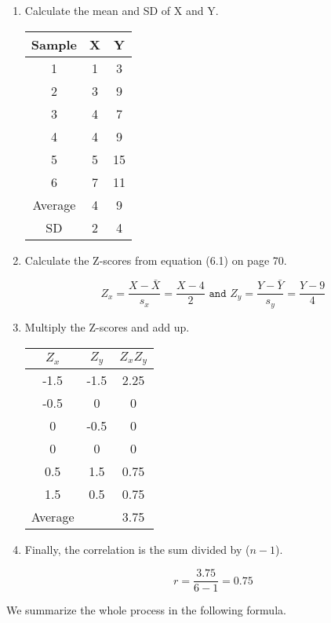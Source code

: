\documentclass[11pt]{book}\usepackage[]{graphicx}\usepackage[]{color}
\begin{document}
\begin{enumerate}
\item Calculate the mean and SD of X and Y.

\begin{table}[ht]
\centering
\begin{tabular}{@{} ccc @{}} \hline
Sample & X & Y \\ \hline
1 & 1 & 3 \\
2 & 3 & 9 \\
3 & 4 & 7 \\
4 & 4 & 9 \\
5 & 5 & 15 \\
6 & 7 & 11 \\ \hline
Average & 4 & 9 \\
SD  & 2 & 4 \\ \hline
\end{tabular}
\end{table}

\item Calculate the Z-scores from equation (6.1) on page 70.  

$$ Z_x = \frac{X - \bar{X}}{s_x} = \frac{X - 4}{2} \texttt{ and } Z_y = \frac{Y - \bar{Y}}{s_y} = \frac{Y - 9}{4} $$

\item Multiply the Z-scores and add up.

\begin{table}[ht]
\centering
\begin{tabular}{@{} ccc @{}} \hline
$Z_x$ & $Z_y$ & $Z_x Z_y$ \\ \hline
-1.5 & -1.5 & 2.25 \\
-0.5 & 0 & 0 \\
0 & -0.5 & 0 \\
0 & 0 & 0 \\
0.5 & 1.5 & 0.75 \\
1.5 & 0.5 & 0.75 \\ \hline
Average &  & 3.75 \\
\end{tabular}
\end{table}

\item Finally, the correlation is the sum divided by ($n - 1$).

$$ r = \frac{3.75}{6 - 1} = 0.75 $$
\end{enumerate}

We summarize the whole process in the following formula. 

\begin{center}
\end{center}
\end{document}
